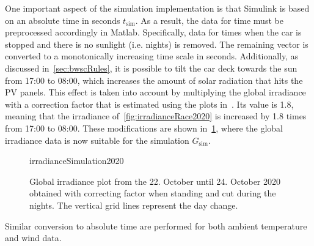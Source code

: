 One important aspect of the simulation implementation is that Simulink is based on an absolute time in seconds $t_\mathrm{sim}$. As a result, the data for time must be preprocessed accordingly in Matlab. Specifically, data for times when the car is stopped and there is no sunlight (i.e. nights) is removed. The remaining vector is converted to a monotonically increasing time scale in seconds. Additionally, as discussed in~\cref{sec:bwscRules}, it is possible to tilt the car deck towards the sun from 17:00 to 08:00, which increases the amount of solar radiation that hits the PV panels. This effect is taken into account by multiplying the global irradiance with a correction factor that is estimated using the plots in~\cite{BuckBoost:2021article}. Its value is 1.8, meaning that the irradiance of~\cref{fig:irradianceRace2020} is increased by 1.8 times from 17:00 to 08:00. These modifications are shown in~\cref{fig:irradianceSimulation2020}, where the global irradiance data is now suitable for the simulation $G_\mathrm{sim}$.
\begin{figure}[htbp]
	\centering
	\begin{externalize}{irradianceSimulation2020}
		
	\end{externalize}
	\caption{Global irradiance plot from the 22. October until 24. October 2020 obtained with correcting factor when standing and cut during the nights. The vertical grid lines represent the day change.}
	\label{fig:irradianceSimulation2020}
\end{figure}

Similar conversion to absolute time are performed for both ambient temperature and wind data.

\newpage
